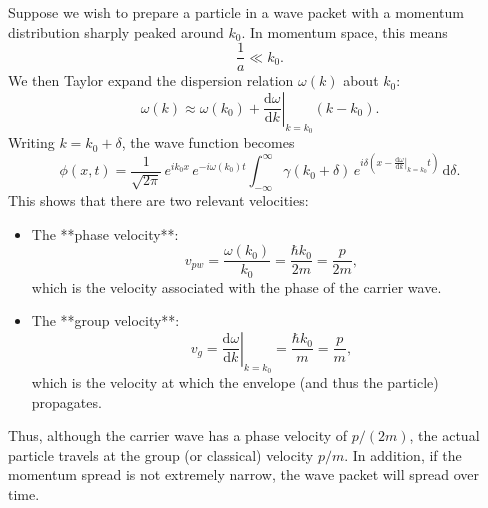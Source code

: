 \begin{remark}
Suppose we wish to prepare a particle in a wave packet with a momentum distribution sharply peaked around \(k_0\). In momentum space, this means
\[
    \frac{1}{a} \ll k_0.
\]
We then Taylor expand the dispersion relation \(\omega(k)\) about \(k_0\):
\[
    \omega(k) \approx \omega(k_0) + \left.\frac{\mathrm{d}\omega}{\mathrm{d}k}\right|_{k=k_0} (k-k_0).
\]
Writing \(k = k_0 + \delta\), the wave function becomes
\[
    \phi(x,t) = \frac{1}{\sqrt{2\pi}}\,e^{ik_0 x}\,e^{-i\omega(k_0)t} \int_{-\infty}^{\infty} \gamma(k_0+\delta)\,e^{i\delta\left(x-\left.\frac{\mathrm{d}\omega}{\mathrm{d}k}\right|_{k=k_0} t\right)} \,\mathrm{d}\delta.
\]
This shows that there are two relevant velocities:
\begin{itemize}
    \item The **phase velocity**:
    \[
        v_{pw} = \frac{\omega(k_0)}{k_0} = \frac{\hbar k_0}{2m} = \frac{p}{2m},
    \]
    which is the velocity associated with the phase of the carrier wave.
    \item The **group velocity**:
    \[
        v_{g} = \left.\frac{\mathrm{d}\omega}{\mathrm{d}k}\right|_{k=k_0} = \frac{\hbar k_0}{m} = \frac{p}{m},
    \]
    which is the velocity at which the envelope (and thus the particle) propagates.
\end{itemize}
Thus, although the carrier wave has a phase velocity of \(p/(2m)\), the actual particle travels at the group (or classical) velocity \(p/m\). In addition, if the momentum spread is not extremely narrow, the wave packet will spread over time.
\end{remark}

